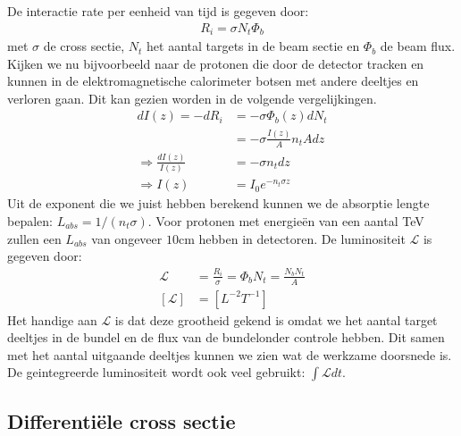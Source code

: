 \documentclass[../main.tex]{subfiles}
\begin{document}
De interactie rate per eenheid van tijd is gegeven door:
\begin{equation}
    \begin{aligned}
        \label{eq:int_rate}
        R_i=\sigma N_t \Phi_b
    \end{aligned}
\end{equation}
met $\sigma$ de cross sectie, $N_t$ het aantal targets in de beam sectie en $\Phi_b$ de beam flux. Kijken we nu bijvoorbeeld naar de protonen die door de detector tracken en kunnen in de elektromagnetische calorimeter botsen met andere deeltjes en verloren gaan. Dit kan gezien worden in de volgende vergelijkingen.
\begin{equation}
    \begin{aligned}
        \label{eq:beam_intensity}
        dI(z) = -dR_i &= -\sigma\Phi_b(z)dN_t\\
                      &= -\sigma\frac{I(z)}{A}n_tAdz\\
        \Rightarrow\frac{dI(z)}{I(z)}&=-\sigma n_tdz\\
        \Rightarrow I(z)&=I_0e^{-n_t\sigma z}
    \end{aligned}
\end{equation}
Uit de exponent die we juist hebben berekend kunnen we de absorptie lengte bepalen: $L_{abs}=1/(n_t\sigma)$. Voor protonen met energieën van een aantal TeV zullen een $L_{abs}$ van ongeveer $10$cm hebben in detectoren. De luminositeit $\mathcal{L}$ is gegeven door:
\begin{equation}
    \begin{aligned}
        \label{eq:luminositeit}
        \mathcal{L} &= \frac{R_i}{\sigma} = \Phi_b N_t = \frac{N_bN_t}{A}\\
        [\mathcal{L}] &= [L^{-2}T^{-1}]
    \end{aligned}
\end{equation}
Het handige aan $\mathcal{L}$ is dat deze grootheid gekend is omdat we het aantal target deeltjes in de bundel en de flux van de bundelonder controle hebben. Dit samen met het aantal uitgaande deeltjes kunnen we zien wat de werkzame doorsnede is. De geintegreerde luminositeit wordt ook veel gebruikt: $\int \mathcal{L}dt$.

\subsection{Differentiële cross sectie}%
\label{sub:differentiele_cross_sectie}
\end{document}
